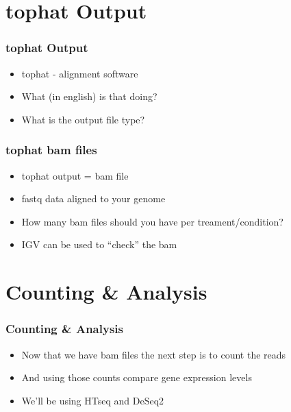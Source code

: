 \documentclass[14pt,handout]{beamer}
\begin{document}
\section{tophat Output}

\begin{frame}
\frametitle{tophat Output}
\begin{itemize}
	\item<+-> tophat - alignment software
	\item<+-> What (in english) is that doing?
	\item<+-> What is the output file type?
\end{itemize}
\end{frame}

\begin{frame}
\frametitle{tophat bam files}
\begin{itemize}
	\item<+-> tophat output = bam file
	\item<+-> fastq data aligned to your genome
	\item<+-> How many bam files should you have per treament/condition?
	\item<+-> IGV can be used to ``check'' the bam
\end{itemize}
\end{frame}

\section{Counting \& Analysis}

\begin{frame}
\frametitle{Counting \& Analysis}
\begin{itemize}
	\item<+-> Now that we have bam files the next step is to count the reads
	\item<+-> And using those counts compare gene expression levels
	\item<+-> We'll be using HTseq and DeSeq2
\end{itemize}
\end{frame}

\end{document}
